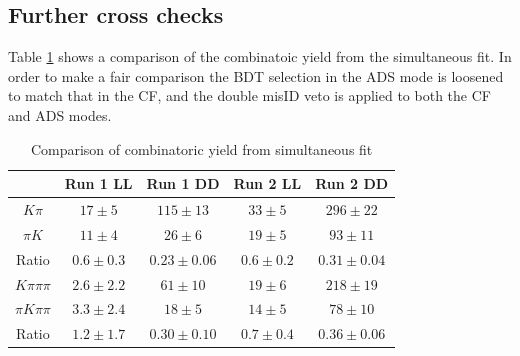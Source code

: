 %
%
%

\newpage
\clearpage

\subsection{Further cross checks}

Table \ref{combinatoricyields} shows a comparison of the combinatoic yield from the simultaneous fit. In order to make a fair comparison the BDT selection in the ADS mode is loosened to match that in the CF, and the double misID veto is applied to both the CF and ADS modes.

\begin{table}[!h]
\centering
\begin{tabular}{c|cccc}
& Run 1 LL & Run 1 DD & Run 2 LL & Run 2 DD \\
\hline
$K\pi$ & $17 \pm 5$ & $115 \pm 13$ & $33 \pm 5$ & $296 \pm 22$ \\
$\pi K$ & $11 \pm 4$ & $26 \pm 6$ & $19 \pm 5$ & $93 \pm 11$ \\
\hline
Ratio & $0.6 \pm 0.3$ & $0.23 \pm 0.06$ & $0.6 \pm 0.2$ & $0.31 \pm 0.04$ \\
\hline
$K\pi\pi\pi$ & $2.6 \pm 2.2$ & $61 \pm 10$ & $19 \pm 6$ & $218 \pm 19$ \\
$\pi K\pi\pi$ & $3.3 \pm 2.4$ & $18 \pm 5$ & $14 \pm 5$ & $78 \pm 10$ \\
\hline
Ratio & $1.2 \pm 1.7$ & $0.30 \pm 0.10$ & $0.7 \pm 0.4$ & $0.36 \pm 0.06$ \\
\hline
\end{tabular}
\caption{Comparison of combinatoric yield from simultaneous fit}
\label{combinatoricyields}
\end{table}

